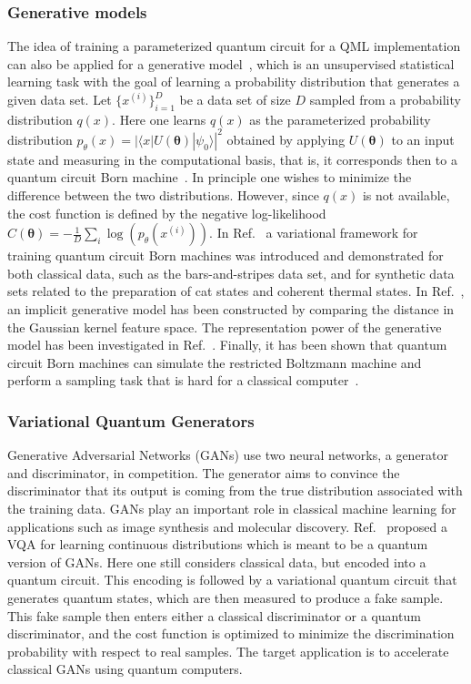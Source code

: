 \documentclass[prx,twocolumn,floatfix,superscriptaddress,longbibliography]{revtex4-1}
\renewcommand{\vec}[1]{\boldsymbol{#1}}  %
\newcommand{\<}{\langle}
\renewcommand{\>}{\rangle}
\renewcommand{\vec}[1]{\boldsymbol{#1}}  %
\begin{document}
\subsubsection{  Generative models} The idea of training a parameterized quantum circuit for a QML implementation can also be applied for a generative model~\cite{verdon2017quantum,benedetti2019generative,du2020expressive}, which is an unsupervised statistical learning task with the goal of learning a probability distribution that generates a given data set. Let $\{x^{(i)}\}_{i=1}^{D}$ be a data set of size $D$ sampled from 
a probability distribution $q(x)$. Here one learns $q(x)$ as the parameterized probability 
distribution $p_{\theta}(x) =|\langle x | U(\vec{\theta}) |\psi _0 \rangle |^2 $ obtained by applying $U(\vec{\theta})$ to an input state and measuring in the computational basis, that is, it corresponds then to a quantum circuit Born machine~\cite{benedetti2019generative}. In principle one wishes to minimize the difference between the two distributions. However, since $q(x)$ is not available,  the cost function is defined by the negative log-likelihood 
$C(\vec{\theta})=- \frac{1}{D} \sum_{i} \log( p_{\theta}(x^{(i)}) )$.
In Ref.~\cite{benedetti2019generative} a variational framework for training quantum circuit Born machines was introduced and demonstrated for both classical data, such as the bars-and-stripes data set, and for synthetic data sets related to the preparation of cat states and coherent thermal states. In Ref.~\cite{liu2018differentiable}, an implicit generative model has been constructed by comparing the distance in the Gaussian kernel feature space. The representation power of the generative model has been investigated in Ref.~\cite{du2020expressive}.  Finally, it has been shown that quantum circuit Born machines can simulate the restricted Boltzmann machine and perform a sampling task that is hard for a classical computer~\cite{coyle2020born}.

\subsubsection{ Variational Quantum Generators} Generative Adversarial Networks (GANs) use two neural networks, a generator and discriminator, in competition. The generator aims to convince the discriminator that its output is coming from the true distribution associated with the training data. GANs play an important role in classical machine learning for applications such as image synthesis and molecular discovery. Ref.~\cite{romero2019variational} proposed a VQA for learning continuous distributions  which is meant to be a quantum version of GANs. Here one still considers classical data, but encoded into a quantum circuit. This encoding is followed by a variational quantum circuit that generates quantum states, which are then measured to produce a fake sample. This fake sample then enters either a classical discriminator or a quantum discriminator, and the cost function is optimized to minimize the discrimination probability with respect to real samples. The target application is to accelerate classical GANs using quantum computers.
\end{document}
